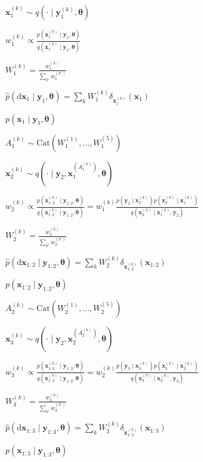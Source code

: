 $\mathbf x_1^{(k)} \sim q(\cdot \mid \mathbf y_1^{(k)}, \mathbf \theta)$

$w_1^{(k)} \propto \frac{p\left(\mathbf x_1^{(k)} \mid \mathbf y_1, \mathbf \theta\right)}{q\left(\mathbf x_1^{(k)} \mid \mathbf y_1, \mathbf \theta \right)}$

$W_1^{(k)} = \frac{w_1^{(k)}}{\sum_{k'} w_1^{(k')}}$

$\hat p(\mathrm d \mathbf x_1 \mid \mathbf y_1, \mathbf \theta) = \sum_k W_1^{(k)} \delta_{\mathbf x_1^{(k)}}(\mathbf x_1)$

$p(\mathbf x_1 \mid \mathbf y_1, \mathbf \theta)$

$A_1^{(k)} \sim \mathrm{Cat}(W_1^{(1)}, \dotsc, W_1^{(5)})$

$\mathbf x_2^{(k)} \sim q(\cdot \mid \mathbf y_2, \mathbf x_1^{(A_1^{(k)})}, \mathbf \theta)$

$w_2^{(k)} \propto \frac{p\left(\mathbf x_{1:2}^{(k)} \mid \mathbf y_{1:2}, \mathbf \theta\right)}{q\left(\mathbf x_{1:2}^{(k)} \mid \mathbf y_{1:2}, \mathbf \theta \right)} = w_1^{(k)} \frac{p\left(\mathbf y_2 \mid \mathbf x_2^{(k)}\right) p\left(\mathbf x_2^{(k)} \mid \mathbf x_1^{(k)}\right)}{q\left(\mathbf x_2^{(k)} \mid \mathbf x_1^{(k)}, \mathbf y_2\right)}$

$W_2^{(k)} = \frac{w_2^{(k)}}{\sum_{k'} w_2^{(k')}}$

$\hat p(\mathrm d \mathbf x_{1:2} \mid \mathbf y_{1:2}, \mathbf \theta) = \sum_k W_2^{(k)} \delta_{\mathbf x_{1:2}^{(k)}}(\mathbf x_{1:2})$

$p(\mathbf x_{1:2} \mid \mathbf y_{1:2}, \mathbf \theta)$

$A_2^{(k)} \sim \mathrm{Cat}(W_2^{(1)}, \dots, W_2^{(5)})$

$\mathbf x_3^{(k)} \sim q(\cdot \mid \mathbf y_2, \mathbf x_2^{(A_2^{(k)})}, \mathbf \theta)$

$w_3^{(k)} \propto \frac{p\left(\mathbf x_{1:3}^{(k)} \mid \mathbf y_{1:3}, \mathbf \theta\right)}{q\left(\mathbf x_{1:3}^{(k)} \mid \mathbf y_{1:3}, \mathbf \theta \right)} = w_2^{(k)} \frac{p\left(\mathbf y_3 \mid \mathbf x_3^{(k)}\right) p\left(\mathbf x_3^{(k)} \mid \mathbf x_2^{(k)}\right)}{q\left(\mathbf x_3^{(k)} \mid \mathbf x_2^{(k)}, \mathbf y_3\right)}$

$W_3^{(k)} = \frac{w_3^{(k)}}{\sum_{k'} w_3^{(k')}}$

$\hat p(\mathrm d \mathbf x_{1:3} \mid \mathbf y_{1:3}, \mathbf \theta) = \sum_k W_3^{(k)} \delta_{\mathbf x_{1:3}^{(k)}}(\mathbf x_{1:3})$

$p(\mathbf x_{1:3} \mid \mathbf y_{1:3}, \mathbf \theta)$

